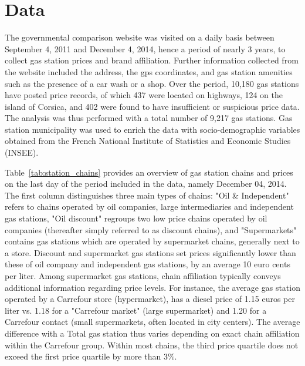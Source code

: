 \documentclass[english]{article}
\begin{document}

\section{Data}

The governmental comparison website was visited on a daily basis between September 4, 2011 and December 4, 2014, hence a period of nearly 3 years, to collect gas station prices and brand affiliation. Further information collected from the website included the address, the gps coordinates, and gas station amenities such as the presence of a car wash or a shop. Over the period, 10,180 gas stations have posted price records, of which 437 were located on highways, 124 on the island of Corsica, and 402 were found to have insufficient or suspicious price data. The analysis was thus performed with a total number of 9,217 gas stations. Gas station municipality was used to enrich the data with socio-demographic variables obtained from the French National Institute of Statistics and Economic Studies (INSEE).

Table~\ref{tab:station_chains} provides an overview of gas station chains and prices on the last day of the period included in the data, namely December 04, 2014. The first column distinguishes three main types of chains: "Oil \& Independent" refers to chains operated by oil companies, large intermediaries and independent gas stations, "Oil discount" regroups two low price chains operated by oil companies (thereafter simply referred to as discount chains), and "Supermarkets" contains gas stations which are operated by supermarket chains, generally next to a store. Discount and supermarket gas stations set prices significantly lower than these of oil company and independent gas stations, by an average 10 euro cents per liter. Among supermarket gas stations, chain affiliation typically conveys additional information regarding price levels. For instance, the average gas station operated by a Carrefour store (hypermarket), has a diesel price of 1.15 euros per liter vs. 1.18 for a "Carrefour market" (large supermarket) and 1.20 for a Carrefour contact (small supermarkets, often located in city centers). The average difference with a Total gas station thus varies depending on exact chain affiliation within the Carrefour group. Within most chains, the third price quartile does not exceed the first price quartile by more than 3\%.
\end{document}
